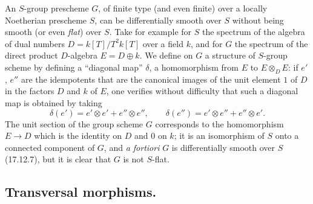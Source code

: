 \begin{remark}[17.12.8]
\label{IV.17.12.8}
An $S$-group prescheme $G$, of finite type (and even finite) over a locally Noetherian prescheme $S$, can be differentially smooth over $S$ without being smooth (or even \emph{flat}) over $S$. Take for example for $S$ the spectrum of the algebra of dual numbers $D=k[T]/T^2k[T]$ over a field $k$, and for $G$ the spectrum of the direct product $D$-algebra $E=D\oplus k$. We define on $G$ a structure of $S$-group scheme by defining a ``diagonal map'' $\delta$, a homomorphism from $E$ to $E\otimes_DE$: if $e'$, $e''$ are the idempotents that are the canonical images of the unit element $1$ of $D$ in the factors $D$ and $k$ of $E$, one verifies without difficulty that such a diagonal map is obtained by taking
\[
\delta(e')=e'\otimes e'+e''\otimes e'',\qquad
\delta(e'')=e'\otimes e''+e''\otimes e'.
\]
The unit section of the group scheme $G$ corresponds to the homomorphism $E\to D$ which is the identity on $D$ and $0$ on $k$; it is an isomorphism of $S$ onto a connected component of $G$, and \emph{a fortiori} $G$ is differentially smooth over $S$ (17.12.7), but it is clear that $G$ is not $S$-flat.
\end{remark}


\subsection{Transversal morphisms.}
\label{IV.17.13}

